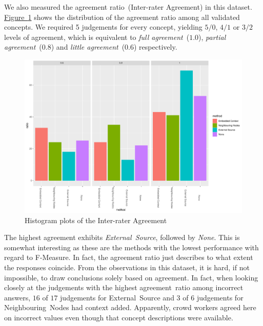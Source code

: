 We also measured the agreement ratio~(Inter-rater Agreement) in this dataset. \hyperref[fig:hist_agreement_climate_change_all]{Figure~\ref*{fig:hist_agreement_climate_change_all}} shows the distribution of the agreement ratio among all validated concepts. We required 5 judgements for every concept, yielding $5/0$, $4/1$ or $3/2$ levels of agreement, which is equivalent to
\emph{full agreement}~($1.0$), \emph{partial agreement}~($0.8$) and \emph{little agreement}~($0.6$) respectively. 
\begin{figure}
  	 \includegraphics[width=\textwidth]{plots/climate_change/hist_agreement}
  	 \caption{Histogram plots of the Inter-rater Agreement}\label{fig:hist_agreement_climate_change_all}
\end{figure}

The highest agreement exhibits \emph{External~Source}, followed by \emph{None}. This is somewhat interesting as these are the methods with the lowest performance with regard to F-Measure. In fact, the agreement ratio just describes to what extent the responses coincide. From the observations in this dataset, it is hard, if not impossible, to draw conclusions solely based on agreement. In fact, when looking closely at the judgements with the highest agreement~ratio among incorrect answers, $16$ of $17$ judgements for External~Source and $3$ of $6$ judgements for Neighbouring~Nodes had context added. Apparently, crowd workers agreed here on incorrect values even though that concept descriptions were available. 

